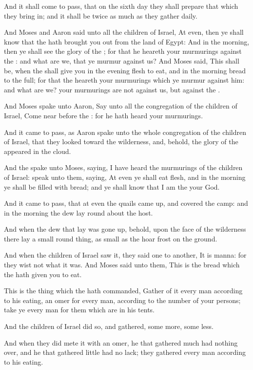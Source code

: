 \Verse And it shall come to pass, that on the sixth day they shall prepare that which they bring in; and it shall be twice as much as they gather daily.

\Verse And Moses and Aaron said unto all the children of Israel, At even, then ye shall know that the \LORD hath brought you out from the land of Egypt: \Verse And in the morning, then ye shall see the glory of the \LORD; for that he heareth your murmurings against the \LORD: and what are we, that ye murmur against us?  \Verse And Moses said, This shall be, when the \LORD shall give you in the evening flesh to eat, and in the morning bread to the full; for that the \LORD heareth your murmurings which ye murmur against him: and what are we? your murmurings are not against us, but against the \LORD.

\Verse And Moses spake unto Aaron, Say unto all the congregation of the children of Israel, Come near before the \LORD: for he hath heard your murmurings.

\Verse And it came to pass, as Aaron spake unto the whole congregation of the children of Israel, that they looked toward the wilderness, and, behold, the glory of the \LORD appeared in the cloud.

\Verse And the \LORD spake unto Moses, saying, \Verse I have heard the murmurings of the children of Israel: speak unto them, saying, At even ye shall eat flesh, and in the morning ye shall be filled with bread; and ye shall know that I am the \LORD your God.

\Verse And it came to pass, that at even the quails came up, and covered the camp: and in the morning the dew lay round about the host.

\Verse And when the dew that lay was gone up, behold, upon the face of the wilderness there lay a small round thing, as small as the hoar frost on the ground.

\Verse And when the children of Israel saw it, they said one to another, It is manna: for they wist not what it was. And Moses said unto them, This is the bread which the \LORD hath given you to eat.

\Verse This is the thing which the \LORD hath commanded, Gather of it every man according to his eating, an omer for every man, according to the number of your persons; take ye every man for them which are in his tents.

\Verse And the children of Israel did so, and gathered, some more, some less.

\Verse And when they did mete it with an omer, he that gathered much had nothing over, and he that gathered little had no lack; they gathered every man according to his eating.


